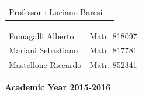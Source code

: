 \documentclass[15pt,a4paper,oneside]{article}
\begin{document}
\begin{center}
\begin{flushleft}
\begin{tabular}{l l }
Professor : Luciano Baresi\\
\end{tabular}
\end{flushleft}

\begin{flushright}
\begin{tabular}{l l }
Fumagalli Alberto & Matr. 818097\\
Mariani Sebastiano & Matr. 817781\\
Mastellone Riccardo & Matr. 852341\\
\end{tabular}
\end{flushright}

\vspace{43mm}
{\large{\bf Academic Year 2015-2016}}
\end{center}

\newpage
\tableofcontents
\listoffigures
\newpage





\newpage

\newpage

\newpage

\newpage

\newpage


%

%

%
\end{document}
